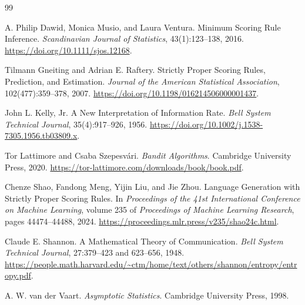 \documentclass[11pt,twoside]{article}
\theoremstyle{definition}
\theoremstyle{remark}
\begin{document}
\clearpage
\begin{thebibliography}{99}

A. Philip Dawid, Monica Musio, and Laura Ventura.
\newblock Minimum Scoring Rule Inference.
\newblock \emph{Scandinavian Journal of Statistics}, 43(1):123--138, 2016.
\newblock \url{https://doi.org/10.1111/sjos.12168}.

Tilmann Gneiting and Adrian E. Raftery.
\newblock Strictly Proper Scoring Rules, Prediction, and Estimation.
\newblock \emph{Journal of the American Statistical Association},
102(477):359--378, 2007.
\newblock \url{https://doi.org/10.1198/016214506000001437}.

John L. Kelly, Jr.
\newblock A New Interpretation of Information Rate.
\newblock \emph{Bell System Technical Journal}, 35(4):917--926, 1956.
\newblock \url{https://doi.org/10.1002/j.1538-7305.1956.tb03809.x}.

Tor Lattimore and Csaba Szepesv\'ari.
\newblock \emph{Bandit Algorithms}.
\newblock Cambridge University Press, 2020.
\newblock \url{https://tor-lattimore.com/downloads/book/book.pdf}.

Chenze Shao, Fandong Meng, Yijin Liu, and Jie Zhou.
\newblock Language Generation with Strictly Proper Scoring Rules.
\newblock In \emph{Proceedings of the 41st International Conference on
Machine Learning}, volume 235 of \emph{Proceedings of Machine Learning
Research}, pages 44474--44488, 2024.
\newblock \url{https://proceedings.mlr.press/v235/shao24c.html}.

Claude E. Shannon.
\newblock A Mathematical Theory of Communication.
\newblock \emph{Bell System Technical Journal}, 27:379--423 and 623--656,
1948.
\newblock
\url{https://people.math.harvard.edu/~ctm/home/text/others/shannon/entropy/entropy.pdf}.

A. W. van der Vaart.
\newblock \emph{Asymptotic Statistics}.
\newblock Cambridge University Press, 1998.

\end{thebibliography}
\end{document}
